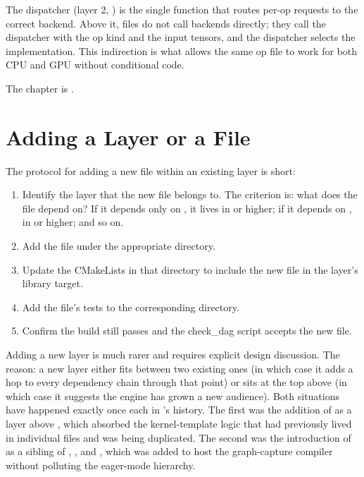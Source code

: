 The dispatcher (layer 2, ) is the
single function that routes per-op requests to the correct backend.
Above it,  files do not call backends directly; they
call the dispatcher with the op kind and the input tensors, and
the dispatcher selects the implementation. This indirection is
what allows the same op file to work for both CPU and GPU without
conditional code.

The chapter is .

\section{Adding a Layer or a File}
\label{sec:layered_dag:adding}

The protocol for adding a new file within an existing layer is
short:

\begin{enumerate}
  \item Identify the layer that the new file belongs to. The
    criterion is: what does the file depend on? If it depends only
    on , it lives in  or higher; if it
    depends on , in  or higher; and so
    on.
  \item Add the file under the appropriate directory.
  \item Update the CMakeLists in that directory to include the
    new file in the layer's library target.
  \item Add the file's tests to the corresponding
     directory.
  \item Confirm the build still passes and the check\_dag script
    accepts the new file.
\end{enumerate}

Adding a new layer is much rarer and requires explicit design
discussion. The reason: a new layer either fits between two
existing ones (in which case it adds a hop to every dependency
chain through that point) or sits at the top above
 (in which case it suggests the engine has grown a
new audience). Both situations have happened exactly once each in
\Lucid's history. The first was the addition of  as a
layer above , which absorbed the kernel-template
logic that had previously lived in individual  files
and was being duplicated. The second was the introduction of
 as a sibling of , , and
, which was added to host the graph-capture compiler
without polluting the eager-mode hierarchy.

